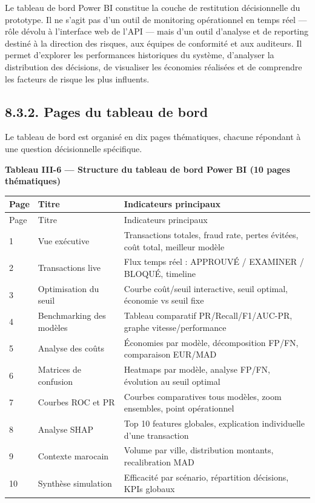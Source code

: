 Le tableau de bord Power BI constitue la couche de restitution décisionnelle du prototype. Il ne s'agit pas d'un outil de monitoring opérationnel en temps réel — rôle dévolu à l'interface web de l'API — mais d'un outil d'analyse et de reporting destiné à la direction des risques, aux équipes de conformité et aux auditeurs. Il permet d'explorer les performances historiques du système, d'analyser la distribution des décisions, de visualiser les économies réalisées et de comprendre les facteurs de risque les plus influents.

\subsection{8.3.2. Pages du tableau de bord}

Le tableau de bord est organisé en dix pages thématiques, chacune répondant à une question décisionnelle spécifique.

\textbf{Tableau III-6 — Structure du tableau de bord Power BI (10 pages thématiques)}

\begin{longtable}{|p{}|p{}|p{}|}
\hline
Page & Titre & Indicateurs principaux \\
\hline
\endfirsthead
\hline
Page & Titre & Indicateurs principaux \\
\hline
\endhead
1 & Vue exécutive & Transactions totales, fraud rate, pertes évitées, coût total, meilleur modèle \\
\hline
2 & Transactions live & Flux temps réel : APPROUVÉ / EXAMINER / BLOQUÉ, timeline \\
\hline
3 & Optimisation du seuil & Courbe coût/seuil interactive, seuil optimal, économie vs seuil fixe \\
\hline
4 & Benchmarking des modèles & Tableau comparatif PR/Recall/F1/AUC-PR, graphe vitesse/performance \\
\hline
5 & Analyse des coûts & Économies par modèle, décomposition FP/FN, comparaison EUR/MAD \\
\hline
6 & Matrices de confusion & Heatmaps par modèle, analyse FP/FN, évolution au seuil optimal \\
\hline
7 & Courbes ROC et PR & Courbes comparatives tous modèles, zoom ensembles, point opérationnel \\
\hline
8 & Analyse SHAP & Top 10 features globales, explication individuelle d'une transaction \\
\hline
9 & Contexte marocain & Volume par ville, distribution montants, recalibration MAD \\
\hline
10 & Synthèse simulation & Efficacité par scénario, répartition décisions, KPIs globaux \\
\hline
\end{longtable}

